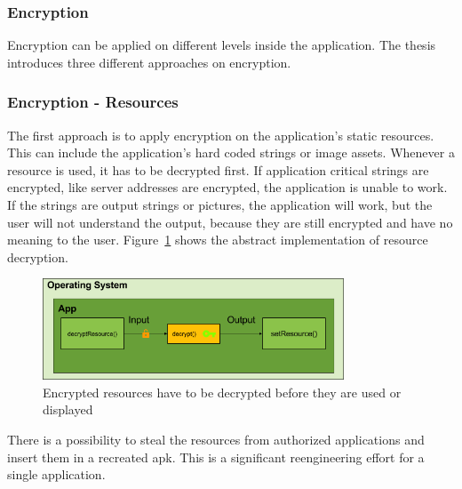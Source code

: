 \subsubsection{Encryption} \label{subsection:counter-replace-encryption-content}
Encryption can be applied on different levels inside the application.
The thesis introduces three different approaches on encryption.

\subsubsection{Encryption - Resources} \label{subsection:counter-replace-encryption-content-resource}
The first approach is to apply encryption on the application's static resources.
This can include the application's hard coded strings or image assets.
Whenever a resource is used, it has to be decrypted first.
\newline
If application critical strings are encrypted, like server addresses are encrypted, the application is unable to work.
If the strings are output strings or pictures, the application will work, but the user will not understand the output, because they are still encrypted and have no meaning to the user.
\newline
Figure~\ref{fig:encryptionResource} shows the abstract implementation of resource decryption.
\begin{figure}[h]
    \centering
    \includegraphics[width=0.8\textwidth]{data/encryptionResource.png}
    \caption{Encrypted resources have to be decrypted before they are used or displayed}
    \label{fig:encryptionResource}
\end{figure}
There is a possibility to steal the resources from authorized applications and insert them in a recreated \gls{apk}.
This is a significant reengineering effort for a single application.

